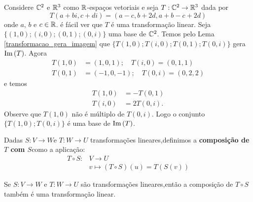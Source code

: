 \begin{exemplo}
    Considere $\mathbb{C}^2$ e $\mathbb{R}^3$ como $\mathbb{R}$-espaços vetoriais e seja $T : \mathbb{C}^2 \to \mathbb{R}^3$ dada por
    \[
        T(a+bi, c+di) = (a - c, b + 2d, a + b - c + 2d)
    \]
    onde $a$, $b$ e $c \in \mathbb{R}$. é fácil ver que $T$ é uma transformação linear. Seja $\{(1,0);(i,0);(0,1);(0,i)\}$ uma base de $\mathbb{C}^2$. Temos pelo Lema \ref{transformacao_gera_imagem} que $\{T(1,0);T(i,0);T(0,1);T(0,i)\}$ gera ${\rm Im\,}(T)$. Agora
    \begin{align*}
        T(1,0) &= (1,0,1);\quad T(i,0) = (0,1,1)\\
        T(0,1) &= (-1,0,-1);\quad T(0,i) = (0,2,2)
    \end{align*}
    e temos
    \begin{align*}
        T(1,0) &= -T(0,1)\\
        T(i,0) &= 2T(0,i).
    \end{align*}
    Observe que $T(1,0)$ não é múltiplo de $T(0,i)$. Logo o conjunto $\{T(1,0); T(0,i)\}$ é uma base de ${\rm Im\,}(T)$.
\end{exemplo}

\begin{definicao}
    Dadas $S \colon V \to W$e $T \colon W \to U$ transformações lineares,definimos a \textbf{composição de $T$ com $S$}como a aplicação:
    \begin{align*}
        T \circ S \colon &V \to U\\
        &v \mapsto (T\circ S)(u) = T(S(v))
    \end{align*}
\end{definicao}

\begin{proposicao}
    Se $S \colon V \to W$ e $T \colon W \to U$ são transformações lineares,então a composição de $T\circ S$ também é uma transformação linear.
\end{proposicao}

